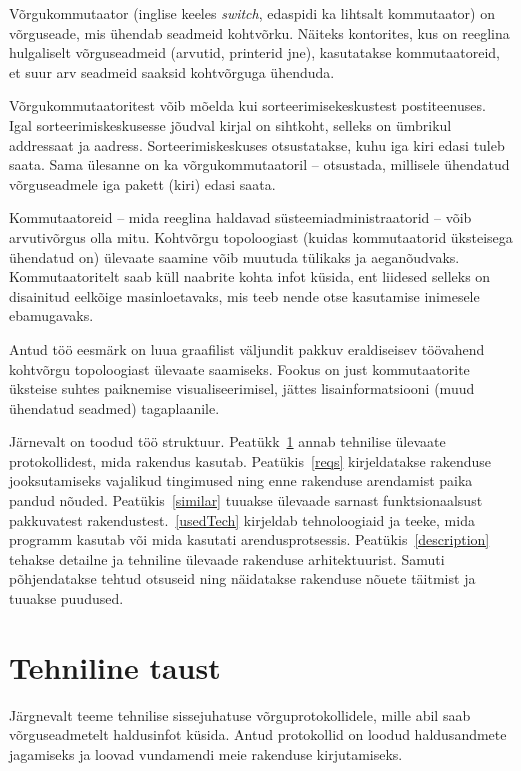 \documentclass[12pt]{article}
\newcommand{\TODO}{\todo[inline]}
\begin{document}
\TODO{ideaga vead üle vaadata}

Võrgukommutaator (inglise keeles \textit{switch}, edaspidi ka lihtsalt kommutaator) on
võrguseade, mis ühendab seadmeid kohtvõrku.
Näiteks kontorites, kus on reeglina hulgaliselt võrguseadmeid (arvutid, printerid jne), kasutatakse
kommutaatoreid, et suur arv seadmeid saaksid kohtvõrguga ühenduda.

Võrgukommutaatoritest võib mõelda kui sorteerimisekeskustest postiteenuses.
Igal sorteerimiskeskusesse jõudval kirjal on sihtkoht, selleks on ümbrikul addressaat ja aadress.
Sorteerimiskeskuses otsustatakse, kuhu iga kiri edasi tuleb saata.
Sama ülesanne on ka võrgukommutaatoril -- otsustada, millisele ühendatud võrguseadmele iga pakett
(kiri) edasi saata.

Kommutaatoreid -- mida reeglina haldavad süsteemiadministraatorid -- võib arvutivõrgus olla mitu.
Kohtvõrgu topoloogiast (kuidas kommutaatorid üksteisega ühendatud on) ülevaate saamine võib
muutuda tülikaks ja aeganõudvaks.
Kommutaatoritelt saab küll naabrite kohta infot küsida, ent liidesed selleks on disainitud eelkõige
masinloetavaks, mis teeb nende otse kasutamise inimesele ebamugavaks.

Antud töö eesmärk on luua graafilist väljundit pakkuv eraldiseisev töövahend kohtvõrgu
topoloogiast ülevaate saamiseks.
Fookus on just kommutaatorite üksteise suhtes paiknemise visualiseerimisel, jättes
lisainformatsiooni (muud ühendatud seadmed) tagaplaanile.

Järnevalt on toodud töö struktuur.
Peatükk~\ref{sec:techintro} annab tehnilise ülevaate protokollidest, mida rakendus kasutab.
Peatükis~\ref{reqs} kirjeldatakse rakenduse jooksutamiseks vajalikud tingimused
ning enne rakenduse arendamist paika pandud nõuded.
Peatükis~\ref{similar} tuuakse ülevaade sarnast funktsionaalsust pakkuvatest
rakendustest.~\ref{usedTech} kirjeldab tehnoloogiaid ja teeke, mida programm kasutab või mida
kasutati arendusprotsessis.
Peatükis~\ref{description} tehakse detailne ja tehniline ülevaade rakenduse arhitektuurist.
Samuti põhjendatakse tehtud otsuseid ning näidatakse rakenduse nõuete täitmist ja tuuakse puudused.

\newpage
\section{Tehniline taust} \label{sec:techintro}
Järgnevalt teeme tehnilise sissejuhatuse võrguprotokollidele, mille abil saab võrguseadmetelt
haldusinfot küsida.
Antud protokollid on loodud haldusandmete jagamiseks ja loovad vundamendi meie rakenduse
kirjutamiseks.
\end{document}
